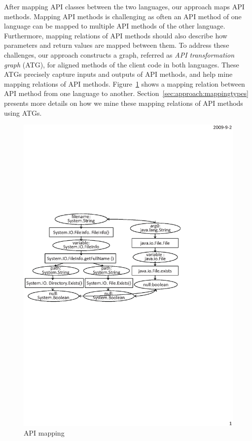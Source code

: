 After mapping API classes between the two languages, our approach maps
API methods. Mapping API methods is challenging as often an API method of one language
can be mapped to multiple API methods of the other language. Furthermore,
mapping relations of API methods should also describe how parameters and return
values are mapped between them. To address these challenges, our approach constructs a
graph, referred as \emph{API transformation graph} (ATG), for
aligned methods of the client code in both languages. These ATGs
precisely capture inputs and outputs of API methods, and help mine
mapping relations of API methods. Figure~\ref{fig:example} shows a mapping
relation between API method  from one language to another.
Section~\ref{sec:approach:mappingtypes} presents more details on how we mine these mapping relations
of API methods using ATGs.

\begin{figure}[t]
\centering
\includegraphics[scale=0.65,clip]{figure/sample.eps}\vspace*{-3ex}
 \caption{\label{fig:example}API mapping}\vspace*{-3ex}
\end{figure}

